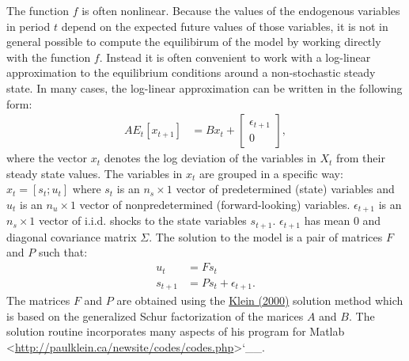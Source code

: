 \documentclass[letterpaper,10pt,openany,oneside,english]{sphinxmanual}
\begin{document}
The function \(f\) is often nonlinear. Because the values of the
endogenous variables in period \(t\) depend on the expected future
values of those variables, it is not in general possible to compute the
equilibirum of the model by working directly with the function
\(f\). Instead it is often convenient to work with a log-linear
approximation to the equilibrium conditions around a non-stochastic
steady state. In many cases, the log-linear approximation can be written
in the following form:
\label{\detokenize{examples:equation-examples:1}}\label{equation:examples:examples:1}\begin{align}
A E_t\left[ x_{t+1} \right] & = B x_t + \left[ \begin{array}{c} \epsilon_{t+1} \\ 0 \end{array} \right],
\end{align}
where the vector \(x_{t}\) denotes the log deviation of the
variables in \(X_t\) from their steady state values. The variables
in \(x_t\) are grouped in a specific way: \(x_t = [s_t; u_t]\)
where \(s_t\) is an \(n_s \times 1\) vector of predetermined
(state) variables and \(u_t\) is an \(n_u \times 1\) vector of
nonpredetermined (forward-looking) variables. \(\epsilon_{t+1}\) is
an \(n_s\times 1\) vector of i.i.d. shocks to the state variables
\(s_{t+1}\). \(\epsilon_{t+1}\) has mean 0 and diagonal
covariance matrix \(\Sigma\). The solution to the model is a pair of
matrices \(F\) and \(P\) such that:
\label{\detokenize{examples:equation-examples:2}}\label{equation:examples:examples:2}\begin{align}
u_t  &  = Fs_t\\
s_{t+1} & = Ps_t + \epsilon_{t+1}.
\end{align}
The matrices \(F\) and \(P\) are obtained using the \href{http://www.sciencedirect.com/science/article/pii/S0165188999000457}{Klein
(2000)}
solution method which is based on the generalized Schur factorization of
the marices \(A\) and \(B\). The solution routine incorporates
many aspects of his program for Matlab
 \textless{}\url{http://paulklein.ca/newsite/codes/codes.php}\textgreater{}{}`\_\_.
\end{document}
